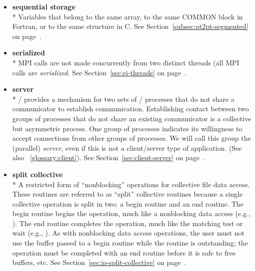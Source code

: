 \begin{itemize}
\label{glossary:sequential_storage}
\item \textbf{ sequential storage} \\*
Variables that belong to the same array,
to the same {\sf COMMON} block in Fortran, or to the same structure in C.
See Section~\ref{subsec:pt2pt-segmented} on page~\pageref{subsec:pt2pt-segmented}.

\label{glossary:serialized}
\item \textbf{ serialized} \\* 
MPI calls are not made concurrently from two distinct threads (all MPI calls are \emph{serialized}.
See Section~\ref{sec:ei-threads} on page~\pageref{sec:ei-threads}.


\label{glossary:server}
\item \textbf{ server} \\*
 \MPI/ provides a mechanism for two sets of \MPI/  processes that do not share a communicator
to establish communication.
Establishing contact between two groups of processes that do not share an
existing communicator is a collective but asymmetric process.  One group of
processes indicates its willingness to accept connections from other groups of
processes.  We will call this group the (parallel) \emph{server}, even if this
is not a client/server type of application.  
(See also ~\ref{glossary:client}). 
See Section~\ref{sec:client-server} on page~\pageref{sec:client-server}.

\label{glossary:split_collective}
\item \textbf{ split collective} \\* 
A restricted form of ``nonblocking'' operations
for collective file data access.
These routines are referred to as ``split'' collective routines
because a single collective operation is split in two:
a begin routine and an end routine.
The begin routine begins the operation,
much like a nonblocking data access (e.g., ).
The end routine completes the operation,
much like the matching test or wait (e.g., ).
As with nonblocking data access operations,
the user must not use the buffer
passed to a begin routine while the routine is outstanding;
the operation must be completed with an end routine before it
is safe to free buffers, etc.
See Section~\ref{sec:io-split-collective} on page~\pageref{sec:io-split-collective}.


\end{itemize}
